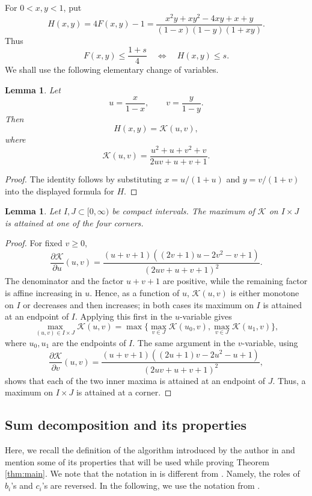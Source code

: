 \documentclass[11pt]{amsart}
\newtheorem{lemma}[theorem]{Lemma}
\newcommand{\Kfun}{\mathcal K}
\begin{document}
For $0<x,y<1$, put
$$
        H(x,y)=4F(x,y)-1
        =\frac{x^2y+xy^2-4xy+x+y}{(1-x)(1-y)(1+xy)}.
$$
Thus
\begin{equation}\label{F_to_H}
        F(x,y)\le \frac{1+s}{4}
        \quad\Longleftrightarrow\quad
        H(x,y)\le s.
\end{equation}
We shall use the following elementary change of variables.

\begin{lemma}\label{lem:K}
Let
$$
        u=\frac{x}{1-x},\qquad v=\frac{y}{1-y}.
$$
Then
$$
        H(x,y)=\Kfun(u,v),
$$
where
$$
        \Kfun(u,v)=
        \frac{u^2+u+v^2+v}{2uv+u+v+1}.
$$

\end{lemma}

\begin{proof}
The identity follows by substituting
$x=u/(1+u)$ and $y=v/(1+v)$ into the displayed formula for $H$.
\end{proof}

\begin{lemma}\label{lem:endpoint-principle}
Let $I,J\subset[0,\infty)$ be compact intervals.  The maximum of
$\Kfun$ on $I\times J$ is attained at one of the four corners.
\end{lemma}

\begin{proof}
For fixed $v\ge0$,
$$
        \frac{\partial \Kfun}{\partial u}(u,v)
        =
        \frac{(u+v+1)((2v+1)u-2v^2-v+1)}
             {(2uv+u+v+1)^2}.
$$
The denominator and the factor $u+v+1$ are positive, while the remaining
factor is affine increasing in $u$.  Hence, as a function of $u$,
$\Kfun(u,v)$ is either monotone on $I$ or decreases and then increases; in
both cases its maximum on $I$ is attained at an endpoint of $I$.  Applying
this first in the $u$-variable gives
$$
        \max_{(u,v)\in I\times J}\Kfun(u,v)
        =
        \max\Big\{\max_{v\in J}\Kfun(u_0,v),
                 \max_{v\in J}\Kfun(u_1,v)\Big\},
$$
where $u_0,u_1$ are the endpoints of $I$.  The same argument in the
$v$-variable, using
$$
        \frac{\partial \Kfun}{\partial v}(u,v)
        =
        \frac{(u+v+1)((2u+1)v-2u^2-u+1)}
             {(2uv+u+v+1)^2},
$$
shows that each of the two inner maxima is attained at an endpoint of $J$.
Thus, a maximum on $I\times J$ is attained at a corner.
\end{proof}


\subsection{Sum decomposition and its properties}\label{subsec:algorithm}
Here, we recall the definition of the algorithm introduced by the author in \cite{ShulgaCusick} and mention some of its properties that will be used while proving Theorem \ref{thm:main}. We note that the notation in \cite{ShulgaCusick} is different from \cite{gayfulin2025realnumbersumreal}. Namely, the roles of $b_i$'s and $c_i$'s are reversed. In the following, we use the notation from \cite{gayfulin2025realnumbersumreal}.
\end{document}
